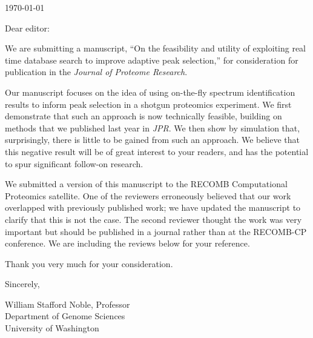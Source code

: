 \documentclass[12pt]{article}
\begin{document}
\hspace*{3.0in}\today

\vspace*{3ex}

\noindent
Dear editor:

\vspace*{1ex}

We are submitting a manuscript, ``On the feasibility and utility of
exploiting real time database search to improve adaptive peak
selection,'' for consideration for publication in the {\em Journal of
  Proteome Research}.

Our manuscript focuses on the idea of using on-the-fly spectrum
identification results to inform peak selection in a shotgun
proteomics experiment.  We first demonstrate that such an approach is
now technically feasible, building on methods that we published last
year in {\em JPR}.  We then show by simulation that, surprisingly,
there is little to be gained from such an approach.  We believe that
this negative result will be of great interest to your readers, and
has the potential to spur significant follow-on research.

We submitted a version of this manuscript to the RECOMB Computational
Proteomics satellite.  One of the reviewers erroneously believed that
our work overlapped with previously published work; we have updated
the manuscript to clarify that this is not the case.  The second
reviewer thought the work was very important but should be published
in a journal rather than at the RECOMB-CP conference.  We are
including the reviews below for your reference.

Thank you very much for your consideration.

\vspace*{1ex}

\noindent
Sincerely,

\hspace*{1ex}

\noindent
William Stafford Noble, Professor\\
Department of Genome Sciences\\
University of Washington

\clearpage
\end{document}
